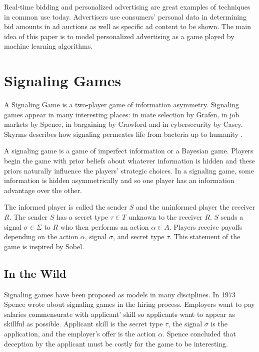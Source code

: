 \documentclass{article}
\begin{document}
Real-time bidding and personalized advertising are great examples of techniques in common use today. Advertisers use consumers' personal data in determining bid amounts in ad auctions as well as specific ad content to be shown. The main idea of this paper is to model personalized advertising as a game played by machine learning algorithms.

\section{Signaling Games}

A Signaling Game is a two-player game of information asymmetry. Signaling games appear in many interesting places: in mate selection by Grafen\cite{grafen1}, in job markets by Spence\cite{spence1973job}, in bargaining by Crawford\cite{crawford1982strategic} and in cybersecurity by Casey\cite{casey1}\cite{casey2}\cite{casey3}. Skyrms describes how signaling permeates life from bacteria up to humanity \cite{skyrms2010signals}.

A signaling game is a game of imperfect information or a Bayesian game\cite{harsanyi2004games}. Players begin the game with prior beliefs about whatever information is hidden and these priors naturally influence the players' strategic choices. In a signaling game, some information is hidden asymmetrically and so one player has an information advantage over the other. 

The informed player is called the sender $S$ and the uninformed player the receiver $R$. The sender $S$ has a secret type $\tau \in T$ unknown to the receiver $R$. $S$ sends a signal $\sigma \in \Sigma$ to $R$ who then performs an action $\alpha \in A$. Players receive payoffs depending on the action $\alpha$, signal $\sigma$, and secret type $\tau$. This statement of the game is inspired by Sobel\cite{sobel1}.

\subsection{In the Wild}

Signaling games have been proposed as models in many disciplines. In 1973 Spence wrote about signaling games in the hiring process\cite{spence1973job}. Employers want to pay salaries commensurate with applicant' skill so applicants want to appear as skillful as possible. Applicant skill is the secret type $\tau$, the signal $\sigma$ is the application, and the employer's offer is the action $\alpha$. Spence concluded that deception by the applicant must be costly for the game to be interesting.
\end{document}
